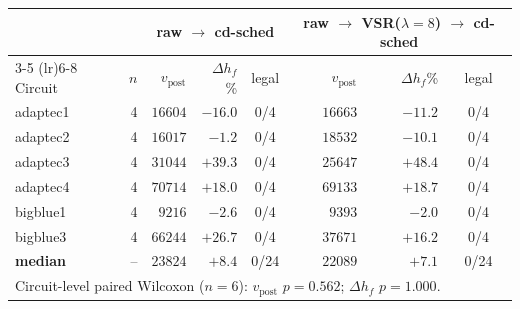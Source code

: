 \begin{tabular}{lr|rrc|rrc}
\toprule
& & \multicolumn{3}{c|}{raw $\to$ cd-sched} & \multicolumn{3}{c}{raw $\to$ VSR($\lambda{=}8$) $\to$ cd-sched} \\
\cmidrule(lr){3-5} \cmidrule(lr){6-8}
Circuit & $n$ & $v_\text{post}$ & $\Delta h_f$\% & legal & $v_\text{post}$ & $\Delta h_f$\% & legal \\
\midrule
adaptec1 & 4 & $16604$ & $-16.0$ & 0/4 & $16663$ & $-11.2$ & 0/4 \\
adaptec2 & 4 & $16017$ & $-1.2$ & 0/4 & $18532$ & $-10.1$ & 0/4 \\
adaptec3 & 4 & $31044$ & $+39.3$ & 0/4 & $25647$ & $+48.4$ & 0/4 \\
adaptec4 & 4 & $70714$ & $+18.0$ & 0/4 & $69133$ & $+18.7$ & 0/4 \\
bigblue1 & 4 & $9216$ & $-2.6$ & 0/4 & $9393$ & $-2.0$ & 0/4 \\
bigblue3 & 4 & $66244$ & $+26.7$ & 0/4 & $37671$ & $+16.2$ & 0/4 \\
\midrule
\textbf{median} & -- & $23824$ & $+8.4$ & 0/24 & $22089$ & $+7.1$ & 0/24 \\
\multicolumn{8}{l}{Circuit-level paired Wilcoxon ($n{=}6$): $v_\text{post}$ $p=0.562$; $\Delta h_f$ $p=1.000$.} \\
\bottomrule
\end{tabular}
